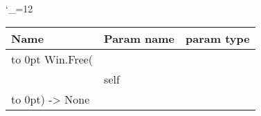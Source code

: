\begingroup \catcode`\_=12 \tt
\begin{tabular}{lll}
\toprule
\textrm{Name}&\textrm{Param name}&\textrm{param type}\\
\midrule
\hbox to 0pt {Win.Free(\hss}\\
& self\\
\hbox to 0pt{) -> None\hss}\\
\bottomrule
\end{tabular}
\endgroup
